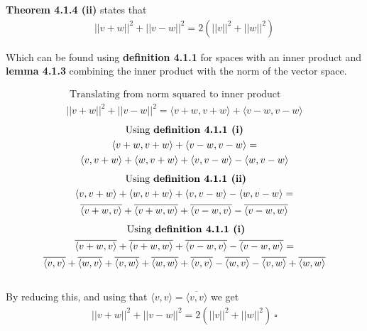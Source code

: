 \documentclass{article}
\begin{document}
\textbf{Theorem 4.1.4 (ii)} states that 
\begin{gather*}
    ||v+w||^2+||v-w||^2=2\left(||v||^2+||w||^2 \right)
\end{gather*}

Which can be found using \textbf{definition 4.1.1} for spaces with an inner product and \textbf{lemma 4.1.3} combining the inner product with the norm of the vector space.

\begin{gather*}
\text{ Translating from norm squared to inner product } \\
    ||v+w||^2+||v-w||^2 = \langle v+w,v+w\rangle +\langle v-w,v-w\rangle 
\end{gather*}
\vspace{-0.5cm}
\begin{gather*}
    \text{Using \textbf{definition 4.1.1 (i)}} \\
    \langle v+w,v+w\rangle +\langle v-w,v-w\rangle = \\
    \langle v, v+w \rangle + \langle w,v+w \rangle + \langle v,v-w \rangle -\langle w,v-w \rangle
\end{gather*}
\vspace{-0.5cm}
\begin{gather*}
\text{ Using \textbf{definition 4.1.1 (ii)}} \\
\langle v, v+w \rangle + \langle w,v+w \rangle + \langle v,v-w \rangle -\langle w,v-w \rangle = \\ 
\overline{\langle v+w, v \rangle } + \overline{\langle v+w,w \rangle} + \overline{\langle v-w,v \rangle} - \overline{\langle v-w,w \rangle}  
\end{gather*}
\vspace{-0.5cm}
\begin{gather*}
\text{ Using \textbf{definition 4.1.1 (i)}} \\
\overline{\langle v+w, v \rangle } + \overline{\langle v+w,w \rangle} + \overline{\langle v-w,v \rangle} - \overline{\langle v-w,w \rangle}  = \\
\overline{\langle v,v \rangle} + \overline{ \langle w,v \rangle} + \overline{\langle v,w \rangle} + \overline{ \langle w,w \rangle} + \overline{\langle v,v \rangle} -\overline{ \langle w,v \rangle}-\overline{ \langle v,w \rangle} + \overline{ \langle w,w \rangle}
\end{gather*}\\

By reducing this, and using that $\langle v,v \rangle = \overline{ \langle v,v \rangle}$ we get
\begin{gather*}
    ||v+w||^2+||v-w||^2 = 2\left(||v||^2+||w||^2 \right) \: \square
\end{gather*}
\end{document}

